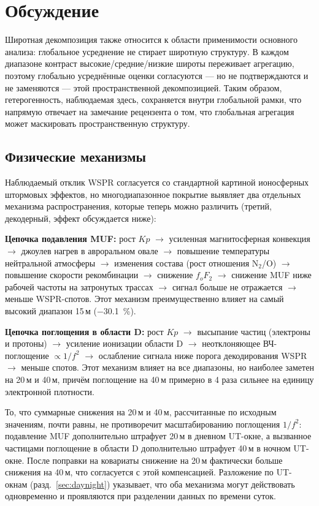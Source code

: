 \documentclass{agujournal2019}
\begin{document}
\section{Обсуждение}

Широтная декомпозиция также относится к области применимости основного
анализа: глобальное усреднение не стирает широтную структуру. В каждом
диапазоне контраст высокие/средние/низкие широты переживает
агрегацию, поэтому глобально усреднённые оценки согласуются
--- но не подтверждаются и не заменяются --- этой пространственной
декомпозицией. Таким образом, гетерогенность, наблюдаемая здесь,
сохраняется внутри глобальной рамки, что напрямую отвечает на
замечание рецензента о том, что глобальная агрегация может
маскировать пространственную структуру.

\subsection{Физические механизмы}

Наблюдаемый отклик WSPR согласуется со стандартной картиной ионосферных
штормовых эффектов, но многодиапазонное покрытие выявляет два отдельных
механизма распространения, которые теперь можно различить (третий,
декодерный, эффект обсуждается ниже):

\textbf{Цепочка подавления MUF:} рост $Kp$ $\rightarrow$ усиленная
магнитосферная конвекция $\rightarrow$ джоулев нагрев в авроральном овале
$\rightarrow$ повышение температуры нейтральной атмосферы $\rightarrow$
изменения состава (рост отношения N$_2$/O) $\rightarrow$ повышение скорости
рекомбинации $\rightarrow$ снижение $f_oF_2$ $\rightarrow$ снижение MUF ниже
рабочей частоты на затронутых трассах $\rightarrow$ сигнал больше не
отражается $\rightarrow$ меньше WSPR-спотов. Этот механизм преимущественно
влияет на самый высокий диапазон 15\,м (\SI{-30,1}{\percent}).

\textbf{Цепочка поглощения в области D:} рост $Kp$ $\rightarrow$ высыпание
частиц (электроны и протоны) $\rightarrow$ усиление ионизации области D
$\rightarrow$ неотклоняющее ВЧ-поглощение $\propto 1/f^2$ $\rightarrow$
ослабление сигнала ниже порога декодирования WSPR $\rightarrow$ меньше
спотов. Этот механизм влияет на все диапазоны, но наиболее заметен на
20\,м и 40\,м, причём поглощение на 40\,м примерно в 4 раза сильнее на
единицу электронной плотности.

То, что суммарные снижения на 20\,м и 40\,м, рассчитанные по исходным
значениям, почти равны, не противоречит
масштабированию поглощения $1/f^2$: подавление MUF дополнительно штрафует
20\,м в дневном UT-окне, а вызванное частицами поглощение в области D дополнительно
штрафует 40\,м в ночном UT-окне. После поправки на ковариаты снижение на 20\,м
фактически больше снижения на 40\,м, что согласуется с этой компенсацией.
Разложение по UT-окнам (разд.~\ref{sec:daynight}) указывает, что оба
механизма могут действовать одновременно и проявляются при разделении
данных по времени суток.
\end{document}
